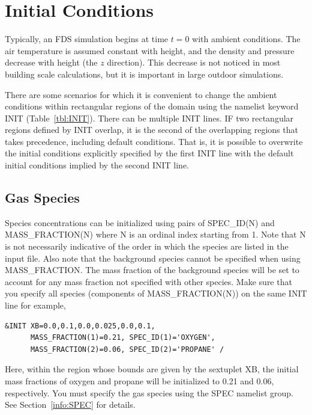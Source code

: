 \documentclass[11pt]{book}
\begin{document}
\chapter{Initial Conditions}
\label{info:INIT}

Typically, an FDS simulation begins at time $t=0$ with ambient conditions. The air temperature is assumed constant with height, and the density and pressure decrease with height (the $z$ direction). This decrease is not noticed in most building scale calculations, but it is important in large outdoor simulations. 

There are some scenarios for which it is convenient to change the ambient conditions within rectangular regions of the domain using the namelist keyword {\ct INIT} (Table~\ref{tbl:INIT}). There can be multiple {\ct INIT} lines. IF two rectangular regions defined by {\ct INIT} overlap, it is the second of the overlapping regions that takes precedence, including default conditions. That is, it is possible to overwrite the initial conditions explicitly specified by the first {\ct INIT} line with the default initial conditions implied by the second {\ct INIT} line.

\section{Gas Species}

Species concentrations can be initialized using pairs of {\ct SPEC\_ID(N)} and {\ct MASS\_FRACTION(N)} where {\ct N} is an ordinal index starting from 1. Note that {\ct N} is not necessarily indicative of the order in which the species are listed in the input file. Also note that the background species cannot be specified when using {\ct MASS\_FRACTION}.  The mass fraction of the background species will be set to account for any mass fraction not specified with other species.
Make sure that you specify all species (components of {\ct MASS\_FRACTION(N)}) on the same {\ct INIT} line for example,
\begin{lstlisting}
&INIT XB=0.0,0.1,0.0,0.025,0.0,0.1,
      MASS_FRACTION(1)=0.21, SPEC_ID(1)='OXYGEN',
      MASS_FRACTION(2)=0.06, SPEC_ID(2)='PROPANE' /
\end{lstlisting}
Here, within the region whose bounds are given by the sextuplet {\ct XB}, the initial mass fractions of oxygen and propane will be initialized to 0.21 and 0.06, respectively. You must specify the gas species using the {\ct SPEC} namelist group. See Section~\ref{info:SPEC} for details.
\end{document}
